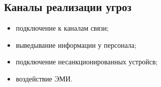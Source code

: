\subsection{Каналы реализации угроз}

\begin{itemize}
 \item подключение к каналам связи;
 \item выведывание информации у персонала;
 \item подключение несанкционированных устройсв;
 \item воздействие ЭМИ.
\end{itemize}

